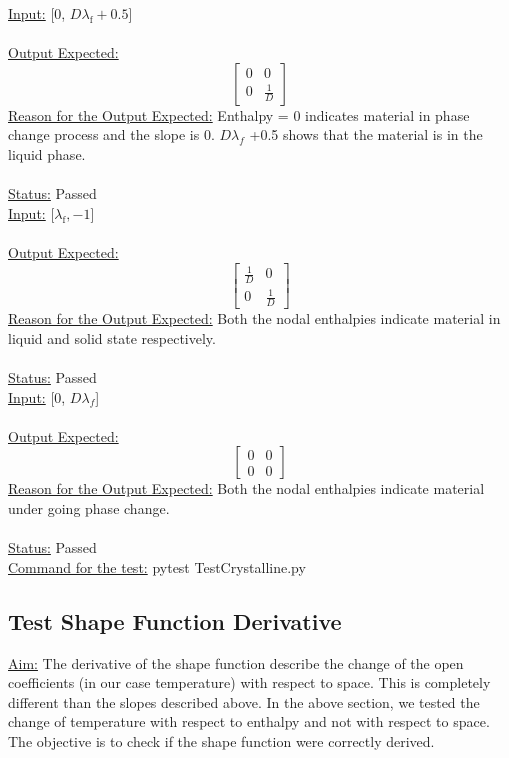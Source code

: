 \noindent \underline{Input:} [0, $D \lambda_\text{f} + 0.5$]\\ \\
\underline{Output Expected:}
\[
\begin{bmatrix}
0 & 0 \\
0 & \frac{1}{D}
\end{bmatrix}
\]
\underline{Reason for the Output Expected:} Enthalpy = 0 indicates material in phase change process and the slope is 0. $D \lambda_f$ +0.5 shows that the material is in the liquid phase.\\ \\
\underline{Status:} Passed\\

\noindent\underline{Input:} [$\lambda_\text{f} , -1$]\\ \\
\noindent\underline{Output Expected:}
\[
\begin{bmatrix}
\frac{1}{D} & 0 \\
0 & \frac{1}{D}
\end{bmatrix}
\]
\underline{Reason for the Output Expected:} Both the nodal enthalpies indicate material in liquid and solid state respectively.\\ \\
\underline{Status:} Passed\\

\noindent \underline{Input:} [0, $D \lambda_f$] \\ \\

\noindent \underline{Output Expected:}
\[
\begin{bmatrix}
0 & 0 \\
0 & 0
\end{bmatrix}
\]
\underline{Reason for the Output Expected:} Both the nodal enthalpies indicate material under going phase change.\\ \\
\underline{Status:} Passed\\

\noindent \underline{Command for the test:} pytest Test\textunderscore Crystalline.py\\

\subsection{Test Shape Function Derivative}
\underline{Aim:} The derivative of the shape function describe the change of the open coefficients (in our case temperature) with respect to space. This is completely different than the slopes described above. In the above section, we tested the change of temperature with respect to enthalpy and not with respect to space. The objective is to check if the shape function were correctly derived. \\ \\

